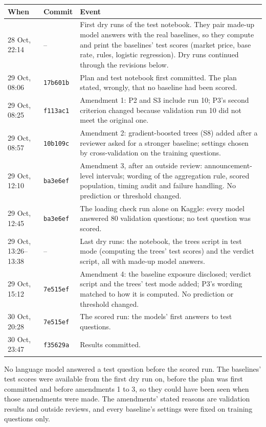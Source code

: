 \documentclass[11pt]{article}
\begin{document}
\begin{table}[H]
\centering\small
\begin{tabularx}{\linewidth}{@{}llX@{}}
\toprule
When & Commit & Event \\
\midrule
28 Oct, 22:14 & -- & First dry runs of the test notebook. They pair made-up model answers with the real baselines, so they compute and print the baselines' test scores (market price, base rate, rules, logistic regression). Dry runs continued through the revisions below. \\
29 Oct, 08:06 & \texttt{17b601b} & Plan and test notebook first committed. The plan stated, wrongly, that no baseline had been scored. \\
29 Oct, 08:25 & \texttt{f113ac1} & Amendment 1: P2 and S3 include run 10; P3's second criterion changed because validation run 10 did not meet the original one. \\
29 Oct, 08:57 & \texttt{10b109c} & Amendment 2: gradient-boosted trees (S8) added after a reviewer asked for a stronger baseline; settings chosen by cross-validation on the training questions. \\
29 Oct, 12:10 & \texttt{ba3e6ef} & Amendment 3, after an outside review: announcement-level intervals; wording of the aggregation rule, scored population, timing audit and failure handling. No prediction or threshold changed. \\
29 Oct, 12:45 & \texttt{ba3e6ef} & The loading check run alone on Kaggle: every model answered 80 validation questions; no test question was scored. \\
29 Oct, 13:26--13:38 & -- & Last dry runs: the notebook, the trees script in test mode (computing the trees' test scores) and the verdict script, all with made-up model answers. \\
29 Oct, 15:12 & \texttt{7e515ef} & Amendment 4: the baseline exposure disclosed; verdict script and the trees' test mode added; P3's wording matched to how it is computed. No prediction or threshold changed. \\
30 Oct, 20:28 & \texttt{7e515ef} & The scored run: the models' first answers to test questions. \\
30 Oct, 23:47 & \texttt{f35629a} & Results committed. \\
\bottomrule
\end{tabularx}
\end{table}

No language model answered a test question before the scored run. The baselines' test scores were available from the first dry run on, before the plan was first committed and before amendments 1 to 3, so they could have been seen when those amendments were made. The amendments' stated reasons are validation results and outside reviews, and every baseline's settings were fixed on training questions only.
\end{document}
